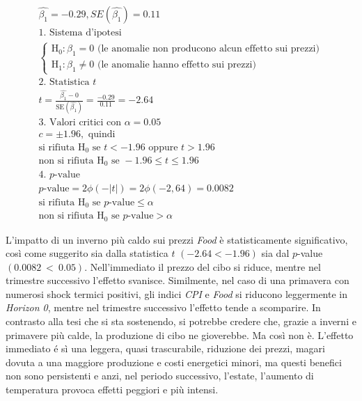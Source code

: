 \begin{gather}
	\hat{\beta_1}=-0.29, SE(\hat{\beta_1})=0.11\\
	\nonumber \text{1. Sistema d'ipotesi}\\
	\nonumber \begin{cases}
		\text{H}_0:\beta_1=0 \text{ (le anomalie non producono alcun effetto sui prezzi)}\\
		\text{H}_1:\beta_1\neq0 \text{ (le anomalie hanno effetto sui prezzi)}
	\end{cases}\\
	\nonumber \text{2. Statistica }t\\
	\nonumber t=\frac{\hat{\beta_1}-0}{\text{SE}(\hat{\beta_1})} = \frac{-0.29}{0.11}=-2.64\\
	\nonumber \text{3. Valori critici con }\alpha=0.05\\
	\nonumber c=\pm1.96,\text{ quindi}\\
	\nonumber \text{si rifiuta H}_0 \text{ se }t<-1.96 \text{ oppure } t>1.96\\
	\nonumber \text{non si rifiuta H}_0 \text{ se }-1.96\le t\le 1.96\\
	\nonumber \text{4. }p \text{-value}\\
	\nonumber p\text{-value}=2\phi(-|t|)=2\phi(-2,64)=0.0082\\
	\nonumber \text{si rifiuta H}_0 \text{ se }p\text{-value} \le \alpha\\
	\nonumber \text{non si rifiuta H}_0 \text{ se }p\text{-value} > \alpha
\end{gather}

L'impatto di un inverno più caldo sui prezzi \textit{Food} è statisticamente significativo, così come suggerito sia dalla statistica $t$ $(-2.64 < -1.96)$ sia dal $p$-value $(0.0082~<~0.05)$. Nell'immediato il prezzo del cibo si riduce, mentre nel trimestre successivo l'effetto svanisce. Similmente, nel caso di una primavera con numerosi shock termici positivi, gli indici \textit{CPI} e \textit{Food} si riducono leggermente in \textit{Horizon 0}, mentre nel trimestre successivo l'effetto tende a scomparire. In contrasto alla tesi che si sta sostenendo, si potrebbe credere che, grazie a inverni e primavere più calde, la produzione di cibo ne gioverebbe. Ma così non è. L'effetto immediato é sì una leggera, quasi trascurabile, riduzione dei prezzi, magari dovuta a una maggiore produzione e costi energetici minori, ma questi benefici non sono persistenti e anzi, nel periodo successivo, l'estate, l'aumento di temperatura provoca effetti peggiori e più intensi.

